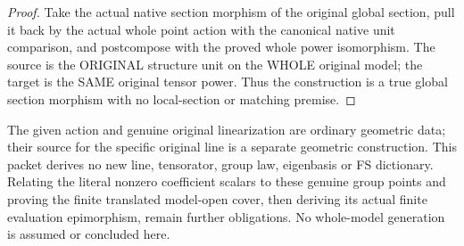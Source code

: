 \begin{proof}
Take the actual native section morphism of the original global section, pull
it back by the actual whole point action with the canonical native unit
comparison, and postcompose with the proved whole power isomorphism. The
source is the ORIGINAL structure unit on the WHOLE original model; the target
is the SAME original tensor power. Thus the construction is a true global
section morphism with no local-section or matching premise.
\end{proof}
The given action and genuine original linearization are ordinary geometric
data; their source for the specific original line is a separate geometric
construction. This packet derives no new line, tensorator, group law,
eigenbasis or FS dictionary. Relating the literal nonzero coefficient scalars
to these genuine group points and proving the finite translated model-open
cover, then deriving its actual finite evaluation epimorphism, remain further
obligations. No whole-model generation is assumed or concluded here.
